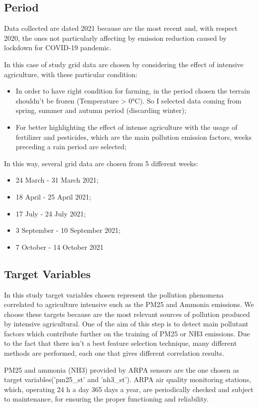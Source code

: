 \par
\subsection{Period}  
Data collected are dated 2021 because are the most recent and, with respect 2020, the ones not particularly affecting by emission reduction caused by lockdown for COVID-19 pandemic\cite{bontempi2022analysis}. 

In this case of study grid data are chosen by considering the effect of intensive agriculture, with these particular condition:
    \begin{itemize}
        \item In order to have right condition for farming, in the period chosen the terrain shouldn't be frozen (Temperature > 0°C). So I selected data coming from spring, summer and autumn period (discarding winter);
        \item For better highlighting the effect of intense agriculture with the usage of fertilizer and pesticides, which are the main pollution emission factors, weeks preceding a rain period are selected;
\end{itemize}
In this way, several grid data are chosen from 5 different weeks:
\begin{itemize}
    \item 24 March - 31 March 2021;
    \item 18 April - 25 April 2021;
    \item 17 July - 24 July 2021;
    \item 3 September - 10 September 2021;
    \item 7 October - 14 October 2021
\end{itemize}

\subsection{Target Variables}
In this study target variables chosen represent the pollution phenomena correlated to agriculture intensive  such as the PM25 and Ammonia emissions. We choose these targets because are the most relevant sources of pollution produced by intensive agricultural.\newline
One of the aim of this step is to detect main pollutant factors which contribute further on the training of PM25 or NH3 emissions.
Due to the fact that there isn’t a best feature selection technique, many different methods are performed, each one that gives different correlation results.\par
PM25 and ammonia (NH3) provided by ARPA sensors are the one chosen as target variables('pm25\_st' and 'nh3\_st'). 
ARPA air quality monitoring stations, which, operating 24 h a day 365 days a year, are periodically checked and subject to maintenance, for ensuring the proper functioning and reliability.


